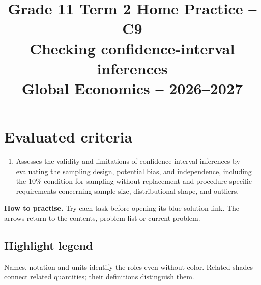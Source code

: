 \makeatletter
{}
\makeatother




\CoordinatedTermTwoPalette
\usepackage{needspace}
\usepackage{titling}
\setlength{\droptitle}{-2em}
\pretitle{\par\begingroup\centering\LARGE}
\posttitle{\par\endgroup}
\preauthor{}\postauthor{}
\predate{}\postdate{}
\maketitlehookd{\vspace{-1em}}
\linespread{1.12}
\setlength{\parskip}{5pt}

\title{Grade 11 Term 2 Home Practice -- C9\\\large Checking confidence-interval inferences\\[0.25em]
	\normalsize Global Economics -- 2026--2027}
\author{}
\date{}


	\maketitle

	\setcounter{tocdepth}{1}
	\setcounter{secnumdepth}{2}
	\label{toc}
	\tableofcontents

	\section*{Evaluated criteria}
	\begin{enumerate}[label=\textbf{C\arabic*},start=9]
		\item Assesses the validity and limitations of confidence-interval inferences by evaluating the sampling design, potential bias, and independence, including the 10\% condition for sampling without replacement and procedure-specific requirements concerning sample size, distributional shape, and outliers.
	\end{enumerate}

	\textbf{How to practise.} Try each task before opening its blue solution link. The arrows return to the contents, problem list or current problem.


\subsection*{Highlight legend}
\label{tab:highlight-legend}
Names, notation and units identify the roles even without color. Related shades connect related quantities; their definitions distinguish them.

